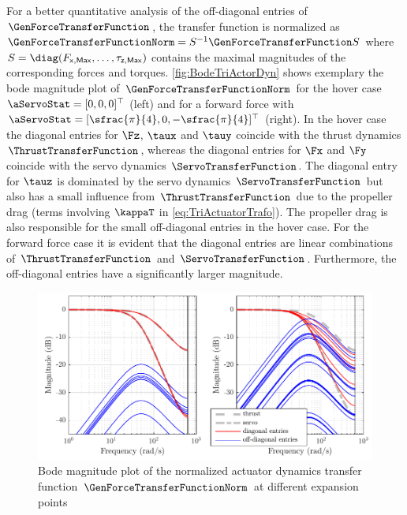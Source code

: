 For a better quantitative analysis of the off-diagonal entries of $\GenForceTransferFunction$, the transfer function is normalized as $\GenForceTransferFunctionNorm = S^{-1} \GenForceTransferFunction S $ where $S = \diag(F_{\mathsf{x,Max}}, \ldots, \tau_{\mathsf{z,Max}})$ contains the maximal magnitudes of the corresponding forces and torques.
\autoref{fig:BodeTriActorDyn} shows exemplary the bode magnitude plot of $\GenForceTransferFunctionNorm$ for the hover case $\aServoStat = [0,0,0]^\top$ (left) and for a forward force with $\aServoStat = [\sfrac{\pi}{4},0,-\sfrac{\pi}{4}]^\top$ (right).
In the hover case the diagonal entries for $\Fz$, $\taux$ and $\tauy$ coincide with the thrust dynamics $\ThrustTransferFunction$, whereas the diagonal entries for $\Fx$ and $\Fy$ coincide with the servo dynamics $\ServoTransferFunction$.
The diagonal entry for $\tauz$ is dominated by the servo dynamics $\ServoTransferFunction$ but also has a small influence from $\ThrustTransferFunction$ due to the propeller drag (terms involving $\kappaT$ in \eqref{eq:TriActuatorTrafo}).
The propeller drag is also responsible for the small off-diagonal entries in the hover case.
For the forward force case it is evident that the diagonal entries are linear combinations of $\ThrustTransferFunction$ and $\ServoTransferFunction$.
Furthermore, the off-diagonal entries have a significantly larger magnitude.

\begin{figure}
 \centering
 \includegraphics{graphics/TriActuatorDynamics/BodeTriActorDyn.pdf}
 \caption{Bode magnitude plot of the normalized \Tricopter actuator dynamics transfer function $\GenForceTransferFunctionNorm$ at different expansion points}
 \label{fig:BodeTriActorDyn}
\end{figure}


%  


